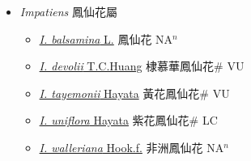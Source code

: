 
  \begin{itemize}
 \item[] \textit{Impatiens} 鳳仙花屬
                    
  \begin{itemize}
        \item[] \href{http://www.theplantlist.org/tpl1.1/search?q=Impatiens+balsamina}{\textit{I. balsamina} L.}   鳳仙花 NA$^n$
        \item[] \href{http://www.theplantlist.org/tpl1.1/search?q=Impatiens+devolii}{\textit{I. devolii} T.C.Huang}   棣慕華鳳仙花\# VU
        \item[] \href{http://www.theplantlist.org/tpl1.1/search?q=Impatiens+tayemonii}{\textit{I. tayemonii} Hayata}   黃花鳳仙花\# VU
        \item[] \href{http://www.theplantlist.org/tpl1.1/search?q=Impatiens+uniflora}{\textit{I. uniflora} Hayata}   紫花鳳仙花\# LC
        \item[] \href{http://www.theplantlist.org/tpl1.1/search?q=Impatiens+walleriana}{\textit{I. walleriana} Hook.f.}   非洲鳳仙花 NA$^n$
  \end{itemize}
  \end{itemize}
